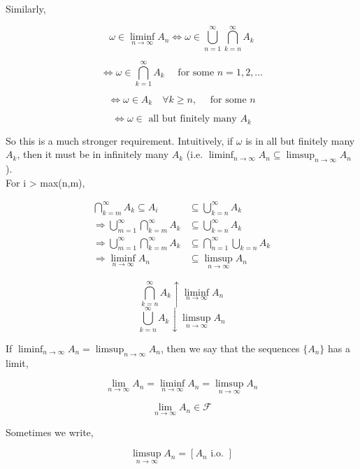 \documentclass[11pt,fleqn]{book} %
\begin{document}
Similarly, 

$$\omega \in \liminf_{n \rightarrow \infty} A_n \Leftrightarrow \omega \in \bigcup^\infty_{n=1} \bigcap^\infty_{k=n} A_k $$

$$ \Leftrightarrow \omega \in \bigcap^\infty_{k=1} A_k \quad \text{ for some } n=1, 2, \dots$$

$$\Leftrightarrow \omega \in A_k \quad \forall k\geq n, \quad \text{ for some } n $$

$$\Leftrightarrow \omega \in \text{ all but finitely many } A_k $$

So this is a much stronger requirement. Intuitively, if $\omega$ is in all but finitely many $A_k$, then it must be in infinitely many $A_k$ (i.e. $\liminf_{n \rightarrow \infty} A_n \subseteq \limsup_{n\rightarrow \infty} A_n$).\\ 


	For i > max(n,m), 

	\begin{align*}
		\bigcap_{k=m}^\infty A_k \subseteq A_i &\subseteq \bigcup_{k=n}^\infty A_k\\
		\Rightarrow \bigcup^\infty_{m=1}\bigcap^\infty_{k=m} A_k &\subseteq \bigcup_{k=n}^\infty A_k\\
		\Rightarrow \bigcup^\infty_{m=1}\bigcap^\infty_{k=m} A_k &\subseteq \bigcap^\infty_{n=1}\bigcup_{k=n} A_k\\
		\Rightarrow \liminf_{n \rightarrow \infty} A_n &\subseteq \limsup_{n \rightarrow \infty} A_n
	\end{align*}
	 
	 $$\bigcap^\infty_{k=n}A_k \uparrow \liminf_{n \rightarrow \infty} A_n $$
	 $$\bigcup^\infty_{k=n}A_k \downarrow \limsup_{n \rightarrow \infty} A_n $$

	 If $\liminf_{n \rightarrow \infty} A_n = \limsup_{n \rightarrow \infty} A_n$, then we say that the sequences $\{A_n\}$ has a limit, 

	 $$\lim_{n \rightarrow \infty} A_n = \liminf_{n \rightarrow \infty} A_n = \limsup_{n \rightarrow \infty} A_n $$

	 $$ \lim_{n \rightarrow \infty} A_n \in \mathcal{F}$$

	 Sometimes we write, 

	 $$ \limsup_{n \rightarrow \infty} A_n = [A_n \text{ i.o. }] $$
\end{document}

